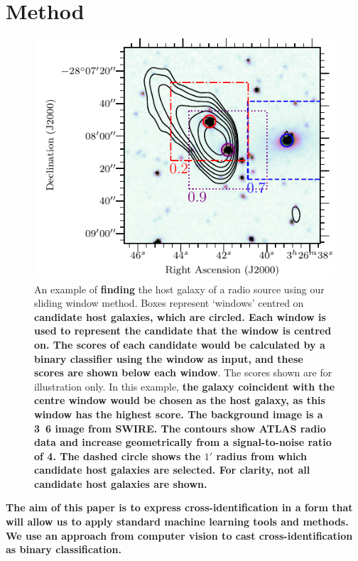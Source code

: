 \documentclass[fleqn,usenatbib,usedcolumn]{mnras}
\newcommand{\edited}[1]{{\bf {#1}}}
\begin{document}
  \section{Method}\label{sec:method}
    \begin{figure}
      \centering
      \includegraphics[width=\columnwidth]{images/figure_example_of_method.pdf}
      \caption{An example of \edited{finding} the host galaxy of a radio source using
        our sliding window method. Boxes represent `windows'
        centred on \edited{candidate host galaxies, which are circled. Each window is used to represent the candidate that the window is centred
        on. The scores of each candidate would be calculated by a binary classifier using the window as input,
        and these scores are shown below each window}. The scores
        shown are for illustration only. In this example,
        \edited{the galaxy coincident with the centre window would be chosen as the host galaxy, as this
        window has the highest score. The background image is a \unit{3.6}{\micro\meter} image from SWIRE.
        The contours show ATLAS radio data and increase geometrically from a signal-to-noise ratio of 4. The dashed circle
        shows the $1'$ radius from which candidate host galaxies are selected. For clarity, not all candidate host galaxies are shown.}}
      \label{fig:windows}
    \end{figure}

  \edited{The aim of this paper is to express cross-identification in a form that
  will allow us to apply standard machine learning tools and methods. We use an approach from computer vision
  to cast cross-identification as binary classification.}
\end{document}
